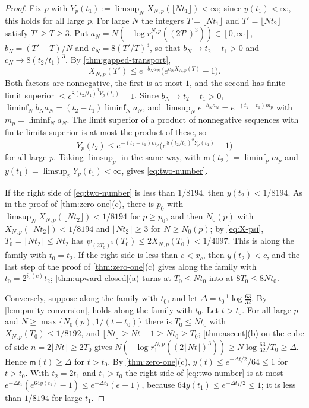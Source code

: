 \documentclass[11pt,a4paper]{amsart}
\theoremstyle{definition}
\theoremstyle{remark}
\numberwithin{equation}{section}
\newcommand{\psiT}[2]{\psi_{#1}(#2)}       %
\newcommand{\cube}[1]{(2#1)^3}             %
\newcommand{\dconst}{\frac{1}{4097}}       %
\newcommand{\xconst}{\frac{1}{8192}}       %
\newcommand{\dconstinl}{1/4097}            %
\newcommand{\xconstinl}{1/8192}            %
\newcommand{\Mcirc}{\text{\upshape(M$^{\circ}$)}}   %
\newcommand{\Bcirc}{\text{\upshape(B$^{\circ}$)}}   %
\newcommand{\tzero}{t_0}                   %
\begin{document}
\begin{proof}
Fix $p$ with $Y_p(t_1):=\limsup_NX_{N,p}(\lfloor Nt_1\rfloor)<\infty$; since $y(t_1)<\infty$, this holds for all large $p$. For large $N$ the integers $T=\lfloor Nt_1\rfloor$ and $T'=\lfloor Nt_2\rfloor$ satisfy $T'\ge T\ge3$. Put $a_N=N(-\log r_1^{N,p}(\cube{T'}))\in[0,\infty]$, $b_N=(T'-T)/N$ and $c_N=8(T'/T)^3$, so that $b_N\to t_2-t_1>0$ and $c_N\to8(t_2/t_1)^3$. By \cref{thm:gapped-transport},
\[
X_{N,p}(T')\le e^{-b_Na_N}\bigl(e^{c_NX_{N,p}(T)}-1\bigr).
\]
Both factors are nonnegative, the first is at most $1$, and the second has finite limit superior $\le e^{8(t_2/t_1)^3Y_p(t_1)}-1$. Since $b_N\to t_2-t_1>0$, $\liminf_Nb_Na_N=(t_2-t_1)\liminf_Na_N$, and $\limsup_Ne^{-b_Na_N}=e^{-(t_2-t_1)m_p}$ with $m_p=\liminf_Na_N$. The limit superior of a product of nonnegative sequences with finite limits superior is at most the product of these, so
\[
Y_p(t_2)\le e^{-(t_2-t_1)m_p}\bigl(e^{8(t_2/t_1)^3Y_p(t_1)}-1\bigr)
\]
for all large $p$. Taking $\limsup_p$ in the same way, with $\mathsf m(t_2)=\liminf_pm_p$ and $y(t_1)=\limsup_pY_p(t_1)<\infty$, gives \eqref{eq:two-number}.

If the right side of \eqref{eq:two-number} is less than $1/8194$, then $y(t_2)<1/8194$. As in the proof of \cref{thm:zero-one}\textup{(c)}, there is $p_0$ with $\limsup_NX_{N,p}(\lfloor Nt_2\rfloor)<1/8194$ for $p\ge p_0$, and then $N_0(p)$ with $X_{N,p}(\lfloor Nt_2\rfloor)<1/8194$ and $\lfloor Nt_2\rfloor\ge3$ for $N\ge N_0(p)$; by \eqref{eq:X-psi}, $T_0=\lfloor Nt_2\rfloor\le Nt_2$ has $\psiT{\cube{T_0}}{T_0}\le2X_{N,p}(T_0)<\dconstinl$. This is \Mcirc{} along the family with $\tzero=t_2$. If the right side is less than $c<x_c$, then $y(t_2)<c$, and the last step of the proof of \cref{thm:zero-one}\textup{(c)} gives \Bcirc{} along the family with $\tzero=2^{i_0(c)}t_2$; \cref{thm:upward-closed}\textup{(a)} turns \Bcirc{} at $T_0\le N\tzero$ into \Mcirc{} at $8T_0\le8N\tzero$.

Conversely, suppose \Mcirc{} along the family with $\tzero$, and let $\Delta=\tzero^{-1}\log\frac{63}{32}$. By \cref{lem:purity-conversion}, \Bcirc{} holds along the family with $\tzero$. Let $t>\tzero$. For all large $p$ and $N\ge\max\{N_0(p),1/(t-\tzero)\}$ there is $T_0\le N\tzero$ with $X_{N,p}(T_0)\le\xconstinl$, and $\lfloor Nt\rfloor\ge Nt-1\ge N\tzero\ge T_0$; \cref{thm:ascent}\textup{(b)} on the cube of side $n=2\lfloor Nt\rfloor\ge2T_0$ gives $N(-\log r_1^{N,p}(\cube{\lfloor Nt\rfloor}))\ge N\log\frac{63}{32}/T_0\ge\Delta$. Hence $\mathsf m(t)\ge\Delta$ for $t>\tzero$. By \cref{thm:zero-one}\textup{(c)}, $y(t)\le e^{-\Delta t/2}/64\le1$ for $t>\tzero$. With $t_2=2t_1$ and $t_1>\tzero$ the right side of \eqref{eq:two-number} is at most $e^{-\Delta t_1}(e^{64y(t_1)}-1)\le e^{-\Delta t_1}(e-1)$, because $64y(t_1)\le e^{-\Delta t_1/2}\le1$; it is less than $1/8194$ for large $t_1$.
\end{proof}
\end{document}
